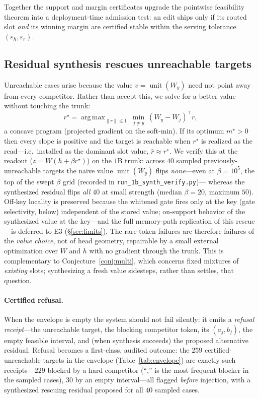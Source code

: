 \documentclass[10pt,twocolumn]{article}
\theoremstyle{remark}
\DeclareMathOperator*{\argmax}{arg\,max}
\DeclareMathOperator{\unit}{unit}
\begin{document}
\noindent Together the support and margin certificates upgrade the pointwise
feasibility theorem into a deployment-time admission test: an edit ships only if
its routed slot \emph{and} its winning margin are certified stable within the
serving tolerance $(\varepsilon_h,\varepsilon_r)$.

\subsection{Residual synthesis rescues unreachable targets}
\label{sec:synth}
Unreachable cases arise because the value $v=\unit(W_y)$
need not point away from every competitor. Rather than accept this, we solve for a
better value without touching the trunk:
\[ r^{\star}=\argmax_{\lVert r\rVert\le1}\ \min_{j\ne y}\ (W_y-W_j)^{\top}r, \]
a concave program (projected gradient on the soft-min). If its optimum
$m^{\star}>0$ then every slope is positive and the target is reachable when
$r^{\star}$ is realized as the read---i.e.\ installed as the dominant slot value,
$\bar r\approx r^{\star}$. We verify
this at the readout ($z=W(h+\beta r^{\star})$) on the $1$B trunk: across $40$
sampled previously-unreachable
targets the naive value $\unit(W_y)$ flips \emph{none}---even at $\beta=10^{5}$, the top of the swept $\beta$ grid (recorded in \texttt{run\_1b\_synth\_verify.py})---
whereas the synthesized residual flips \emph{all $40$} at small strength (median
$\beta=20$, maximum $50$). Off-key locality is preserved because the
whitened gate fires only at the key (gate selectivity, below) independent of the
stored value; on-support behavior of the synthesized value at the key---and the
full memory-path replication of this rescue---is deferred to E3
(\S\ref{sec:limits}). The rare-token failures are therefore failures of the \emph{value
choice}, not of head geometry, repairable by a small external optimization over
$W$ and $h$ with no gradient through the trunk. This is complementary to
Conjecture~\ref{conj:multi}, which concerns fixed mixtures of \emph{existing}
slots; synthesizing a fresh value sidesteps, rather than settles, that question.

\paragraph{Certified refusal.}
When the envelope is empty the system should not fail silently: it emits a
\emph{refusal receipt}---the unreachable target, the blocking competitor token, its
$(a_j,b_j)$, the empty feasible interval, and (when synthesis succeeds) the proposed
alternative residual. Refusal becomes a first-class, audited outcome: the $259$
certified-unreachable targets in the envelope (Table~\ref{tab:envelope}) are exactly
such receipts---$229$ blocked by a hard competitor (``,'' is the most frequent
blocker in the sampled cases), $30$ by an empty interval---all flagged
\emph{before} injection, with a synthesized rescuing residual proposed for all $40$
sampled cases.
\end{document}
